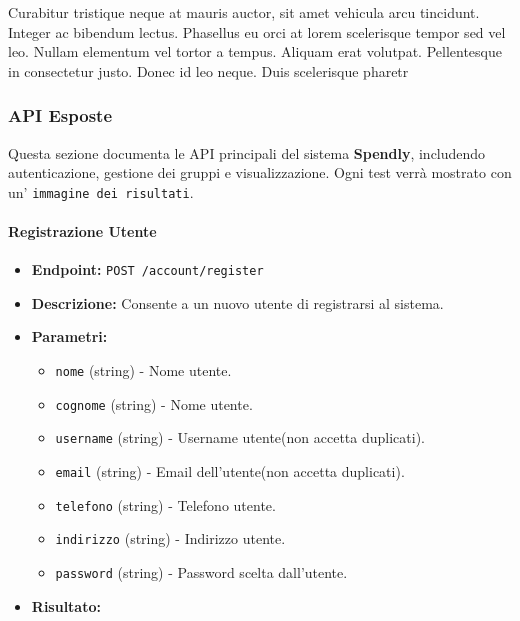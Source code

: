 Curabitur tristique neque at mauris auctor, sit amet vehicula arcu tincidunt. Integer ac bibendum lectus. Phasellus eu orci at lorem scelerisque tempor sed vel leo. Nullam elementum vel tortor a tempus. Aliquam erat volutpat. Pellentesque in consectetur justo. Donec id leo neque. Duis scelerisque pharetr

\subsubsection{API Esposte}

Questa sezione documenta le API principali del sistema \textbf{Spendly}, includendo autenticazione, gestione dei gruppi e visualizzazione. Ogni test verrà mostrato con un' \texttt{immagine dei risultati}.

\paragraph{Registrazione Utente}
\begin{itemize}
    \item \textbf{Endpoint:} \texttt{POST /account/register}
    \item \textbf{Descrizione:} Consente a un nuovo utente di registrarsi al sistema.
    \item \textbf{Parametri:}
    \begin{itemize}
        \item \texttt{nome} (string) - Nome utente.
        \item \texttt{cognome} (string) - Nome utente.
        \item \texttt{username} (string) - Username utente(non accetta duplicati).
        \item \texttt{email} (string) - Email dell'utente(non accetta duplicati).
        \item \texttt{telefono} (string) - Telefono utente.
        \item \texttt{indirizzo} (string) - Indirizzo utente.
        \item \texttt{password} (string) - Password scelta dall'utente.
    \end{itemize}
    \item \textbf{Risultato:}
\end{itemize}
